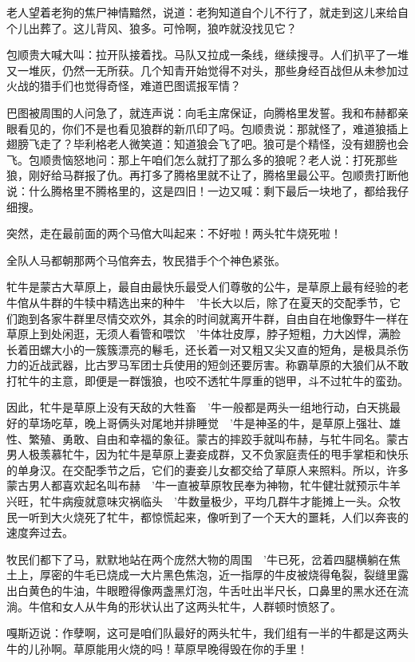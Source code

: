\par 老人望着老狗的焦尸神情黯然，说道：老狗知道自个儿不行了，就走到这儿来给自个儿出葬了。这儿背风、狼多。可怜啊，狼咋就没找见它？
\par 包顺贵大喊大叫：拉开队接着找。马队又拉成一条线，继续搜寻。人们扒平了一堆又一堆灰，仍然一无所获。几个知青开始觉得不对头，那些身经百战但从未参加过火战的猎手们也觉得奇怪，难道巴图谎报军情？
\par 巴图被周围的人问急了，就连声说：向毛主席保证，向腾格里发誓。我和布赫都亲眼看见的，你们不是也看见狼群的新爪印了吗。包顺贵说：那就怪了，难道狼插上翅膀飞走了？毕利格老人微笑道：知道狼会飞了吧。狼可是个精怪，没有翅膀也会飞。包顺贵恼怒地问：那上午咱们怎么就打了那么多的狼呢？老人说：打死那些狼，刚好给马群报了仇。再打多了腾格里就不让了，腾格里最公平。包顺贵打断他说：什么腾格里不腾格里的，这是四旧！一边又喊：剩下最后一块地了，都给我仔细搜。
\par 突然，走在最前面的两个马倌大叫起来：不好啦！两头牤牛烧死啦！
\par 全队人马都朝那两个马倌奔去，牧民猎手个个神色紧张。
\par 牤牛是蒙古大草原上，最自由最快乐最受人们尊敬的公牛，是草原上最有经验的老牛倌从牛群的牛犊中精选出来的种牛　’牛长大以后，除了在夏天的交配季节，它们跑到各家牛群里尽情交欢外，其余的时间就离开牛群，自由自在地像野牛一样在草原上到处闲逛，无须人看管和喂饮　’牛体壮皮厚，脖子短粗，力大凶悍，满脸长着田螺大小的一簇簇漂亮的鬈毛，还长着一对又粗又尖又直的短角，是极具杀伤力的近战武器，比古罗马军团士兵使用的短剑还要厉害。称霸草原的大狼们从不敢打牤牛的主意，即便是一群饿狼，也咬不透牤牛厚重的铠甲，斗不过牤牛的蛮劲。
\par 因此，牤牛是草原上没有天敌的大牲畜　’牛一般都是两头一组地行动，白天挑最好的草场吃草，晚上哥俩头对尾地并排睡觉　’牛是神圣的牛，是草原上强壮、雄性、繁殖、勇敢、自由和幸福的象征。蒙古的摔跤手就叫布赫，与牤牛同名。蒙古男人极羡慕牤牛，因为牤牛是草原上妻妾成群，又不负家庭责任的甩手掌柜和快乐的单身汉。在交配季节之后，它们的妻妾儿女都交给了草原人来照料。所以，许多蒙古男人都喜欢起名叫布赫　’牛一直被草原牧民奉为神物，牤牛健壮就预示牛羊兴旺，牤牛病瘦就意味灾祸临头　’牛数量极少，平均几群牛才能摊上一头。众牧民一听到大火烧死了牤牛，都惊慌起来，像听到了一个天大的噩耗，人们以奔丧的速度奔过去。
\par 牧民们都下了马，默默地站在两个庞然大物的周围　’牛已死，岔着四腿横躺在焦土上，厚密的牛毛已烧成一大片黑色焦泡，近一指厚的牛皮被烧得龟裂，裂缝里露出白黄色的牛油，牛眼瞪得像两盏黑灯泡，牛舌吐出半尺长，口鼻里的黑水还在流淌。牛倌和女人从牛角的形状认出了这两头牤牛，人群顿时愤怒了。
\par 嘎斯迈说：作孽啊，这可是咱们队最好的两头牤牛，我们组有一半的牛都是这两头牛的儿孙啊。草原能用火烧的吗！草原早晚得毁在你的手里！
